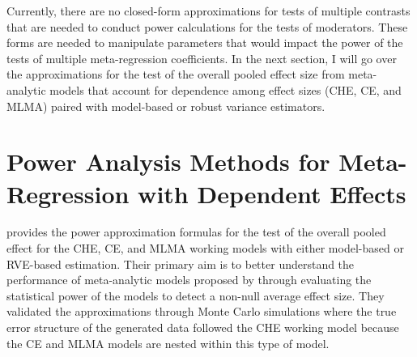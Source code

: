
Currently, there are no closed-form approximations for tests of multiple contrasts that are needed to conduct power calculations for the tests of moderators. These forms are needed to manipulate parameters that would impact the power of the tests of multiple meta-regression coefficients. In the next section, I will go over the approximations for the test of the overall pooled effect size from meta-analytic models that account for dependence among effect sizes (CHE, CE, and MLMA) paired with model-based or robust variance estimators. 


\section{Power Analysis Methods for Meta-Regression with Dependent Effects}
            
\textcite{vembye2023} provides the power approximation formulas for the test of the overall pooled effect for the CHE, CE, and MLMA working models with either model-based or RVE-based estimation. Their primary aim is to better understand the performance of meta-analytic models proposed by \textcite{pustejovsky2022} through evaluating the statistical power of the models to detect a non-null average effect size. They validated the approximations through Monte Carlo simulations where the true error structure of the generated data followed the CHE working model because the CE and MLMA models are nested within this type of model. 

